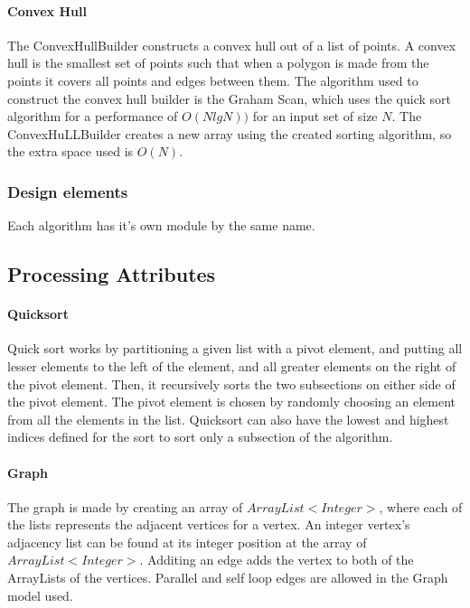 \documentclass[12pt]{article}
\begin{document}
                \paragraph{Convex Hull} The ConvexHullBuilder constructs a convex hull out of a list of points. A convex hull is the smallest set of points such that when a polygon is made from the points it covers all points and edges between them. The algorithm used to construct the convex hull builder is the Graham Scan, which uses the quick sort algorithm for a performance of $O(NlgN))$ for an input set of size $N$. The ConvexHuLLBuilder creates a new array using the created sorting algorithm, so the extra space used is $O(N)$.
            \subsubsection{Design elements}
                Each algorithm has it's own module by the same name.
            \subsection{Processing Attributes} 
                \paragraph{Quicksort} Quick sort works by partitioning a given list with a pivot element, and putting all lesser elements to the left of the element, and all greater elements on the right of the pivot element. Then, it recursively sorts the two subsections on either side of the pivot element. The pivot element is chosen by randomly choosing an element from all the elements in the list. Quicksort can also have the lowest and highest indices defined for the sort to sort only a subsection of the algorithm.
                \paragraph{Graph} The graph is made by creating an array of $ArrayList<Integer>$, where each of the lists represents the adjacent vertices for a vertex. An integer vertex's adjacency list can be found at its integer position at the array of $ArrayList<Integer>$. Additing an edge adds the vertex to both of the ArrayLists of the vertices. Parallel and self loop edges are allowed in the Graph model used.
\end{document}
